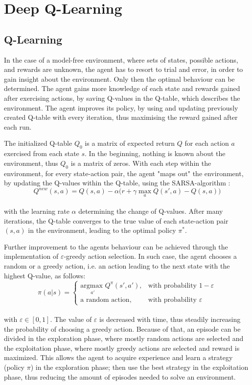 \documentclass{article}
\begin{document}
\section{Deep Q-Learning}

\subsection{Q-Learning}
In the case of a model-free environment, where sets of states, possible actions, and rewards are unknown, the agent has to resort to trial and error, in order to gain insight about the environment. Only then the optimal behaviour can be determined. The agent gains more knowledge of each state and rewards gained after exercising actions, by saving Q-values in the Q-table, which describes the environment. The agent improves its policy, by using and updating previously created Q-table with every iteration, thus maximising the reward gained after each run.

The initialized Q-table $Q_0$ is a matrix of expected return $Q$ for each action $a$ exercised from each state $s$. In the beginning, nothing is known about the environment, thus $Q_0$ is a matrix of zeros. With each step within the environment, for every state-action pair, the agent "maps out" the environment, by updating the Q-values within the Q-table, using the SARSA-algorithm \cite{rummery1994line}:
\begin{equation}
    Q^{new}(s,a) = Q(s,a) - \alpha \Big( r+\gamma \max_{a} Q(s',a) - Q(s,a) \Big)
\end{equation}
\\
with the learning rate $\alpha$ determining the change of Q-values. After many iterations, the Q-table converges to the true value of each state-action pair $(s,a)$ in the environment, leading to the optimal policy $\pi^*$.

Further improvement to the agents behaviour can be achieved through the implementation of $\varepsilon$-greedy action selection. In such case, the agent chooses a random  or a greedy action, i.e. an action leading to the next state with the highest Q-value, as follows:
\begin{equation}
    \pi(a|s) = \begin{cases}
    \underset{a'}{\text{argmax }}Q^{\pi}(s',a'), & \text{with probability }1-\varepsilon \\
    \text{a random action},     & \text{with probability }\varepsilon
    \end{cases}
\end{equation}
\\
with $\varepsilon\in[0,1]$. The value of $\varepsilon$ is decreased with time, thus steadily increasing the probability of choosing a greedy action. Because of that, an episode can be divided in the exploration phase, where mostly random actions are selected and the exploitation phase, where mostly greedy actions are selected and reward is maximized. This allows the agent to acquire experience and learn a strategy (policy $\pi$) in the exploration phase; then use the best strategy in the exploitation phase, thus reducing the amount of episodes needed to solve an environment.
\end{document}
